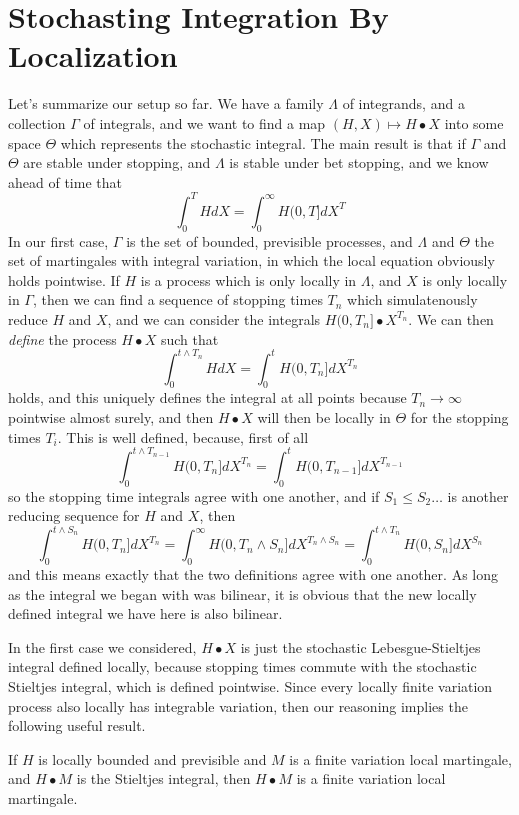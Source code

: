 \section{Stochasting Integration By Localization}

Let's summarize our setup so far. We have a family $\Lambda$ of integrands, and a collection $\Gamma$ of integrals, and we want to find a map $(H,X) \mapsto H \bullet X$ into some space $\Theta$ which represents the stochastic integral. The main result is that if $\Gamma$ and $\Theta$ are stable under stopping, and $\Lambda$ is stable under bet stopping, and we know ahead of time that
%
\[ \int_0^T H dX = \int_0^\infty H(0,T] dX^T \]
%
In our first case, $\Gamma$ is the set of bounded, previsible processes, and $\Lambda$ and $\Theta$ the set of martingales with integral variation, in which the local equation obviously holds pointwise. If $H$ is a process which is only locally in $\Lambda$, and $X$ is only locally in $\Gamma$, then we can find a sequence of stopping times $T_n$ which simulatenously reduce $H$ and $X$, and we can consider the integrals $H(0,T_n] \bullet X^{T_n}$. We can then {\it define} the process $H \bullet X$ such that
%
\[ \int_0^{t \wedge T_n} H dX = \int_0^t H(0,T_n] dX^{T_n} \]
%
holds, and this uniquely defines the integral at all points because $T_n \to \infty$ pointwise almost surely, and then $H \bullet X$ will then be locally in $\Theta$ for the stopping times $T_i$. This is well defined, because, first of all
%
\[ \int_0^{t \wedge T_{n-1}} H(0,T_n] dX^{T_n} = \int_0^t H(0,T_{n-1}] dX^{T_{n-1}} \]
%
so the stopping time integrals agree with one another, and if $S_1 \leq S_2 \dots$ is another reducing sequence for $H$ and $X$, then
%
\[ \int_0^{t \wedge S_n} H(0,T_n] dX^{T_n} = \int_0^\infty H(0,T_n \wedge S_n] dX^{T_n \wedge S_n} = \int_0^{t \wedge T_n} H(0,S_n] dX^{S_n} \]
%
and this means exactly that the two definitions agree with one another. As long as the integral we began with was bilinear, it is obvious that the new locally defined integral we have here is also bilinear.

In the first case we considered, $H \bullet X$ is just the stochastic Lebesgue-Stieltjes integral defined locally, because stopping times commute with the stochastic Stieltjes integral, which is defined pointwise. Since every locally finite variation process also locally has integrable variation, then our reasoning implies the following useful result.

\begin{theorem}
    If $H$ is locally bounded and previsible and $M$ is a finite variation local martingale, and $H \bullet M$ is the Stieltjes integral, then $H \bullet M$ is a finite variation local martingale.
\end{theorem}

